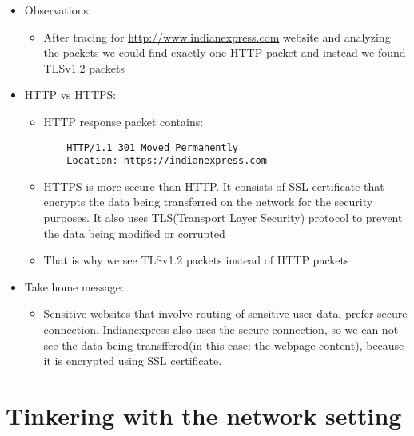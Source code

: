 \documentclass{article}
\begin{document}
\begin{enumerate}[a)]
\begin{enumerate}[i)]
\begin{itemize}
                        \item Observations:
                            \begin{itemize}
                                \item After tracing for \href{http://www.indianexpress.com}{http://www.indianexpress.com} website and analyzing the packets we could find exactly one HTTP packet and instead we found TLSv1.2 packets
                            \end{itemize}{}
                        \item HTTP vs HTTPS:
                            \begin{itemize}
                                \item HTTP response packet contains:
                                    \begin{lstlisting}    
    HTTP/1.1 301 Moved Permanently
    Location: https://indianexpress.com
                                    \end{lstlisting}
                                \item HTTPS is more secure than HTTP. It consists of SSL certificate that encrypts the data being transferred on the network for the security purposes. It also uses TLS(Transport Layer Security) protocol to prevent the data being modified or corrupted
                                \item That is why we see TLSv1.2 packets instead of HTTP packets
                            \end{itemize}{}
                        \item Take home message:
                            \begin{itemize}
                                \item Sensitive websites that involve routing of sensitive user data, prefer secure connection. Indianexpress also uses the secure connection, so we can not see the data being transffered(in this case: the webpage content), because it is encrypted using SSL certificate.
                            \end{itemize}{}
                    \end{itemize}{}
            \end{enumerate}{}
    \end{enumerate}
    \clearpage
\section{Tinkering with the network setting}
\end{document}

